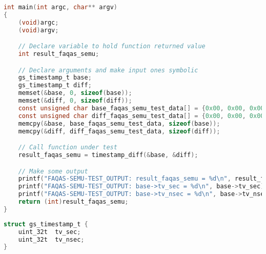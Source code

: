 \begin{lstlisting}[language=C, caption=Test case generated for Libutil., label=semus:testUtil]
int main(int argc, char** argv)
{
    (void)argc;
    (void)argv;

    // Declare variable to hold function returned value
    int result_faqas_semu;

    // Declare arguments and make input ones symbolic
    gs_timestamp_t base;
    gs_timestamp_t diff;
    memset(&base, 0, sizeof(base));
    memset(&diff, 0, sizeof(diff));
    const unsigned char base_faqas_semu_test_data[] = {0x00, 0x00, 0x00, 0x00, 0x00, 0x00, 0x00, 0x00};
    const unsigned char diff_faqas_semu_test_data[] = {0x00, 0x00, 0x00, 0x00, 0x01, 0x00, 0x00, 0x00};
    memcpy(&base, base_faqas_semu_test_data, sizeof(base));
    memcpy(&diff, diff_faqas_semu_test_data, sizeof(diff));

    // Call function under test
    result_faqas_semu = timestamp_diff(&base, &diff);

    // Make some output
    printf("FAQAS-SEMU-TEST_OUTPUT: result_faqas_semu = %d\n", result_faqas_semu);
    printf("FAQAS-SEMU-TEST_OUTPUT: base->tv_sec = %d\n", base->tv_sec);
    printf("FAQAS-SEMU-TEST_OUTPUT: base->tv_nsec = %d\n", base->tv_nsec);
    return (int)result_faqas_semu;
}
\end{lstlisting}

\begin{lstlisting}[language=C, caption=Definition of \emph{gs\_timestamp\_t} in Libutil., label=semus:testUtil:struct]
struct gs_timestamp_t {
    uint_32t  tv_sec;
    uint_32t  tv_nsec;
}
\end{lstlisting}

